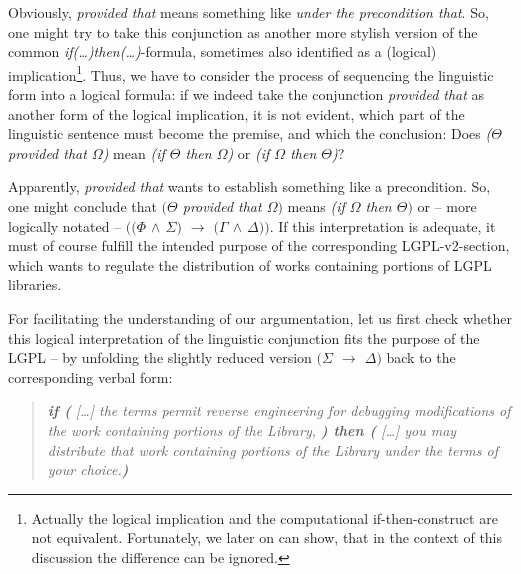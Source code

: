 Obviously, \emph{provided that} means something like \emph{under the
precondition that}. So, one might try to take this conjunction as another more
stylish version of the common \emph{if(\ldots)then(\ldots)}-formula, sometimes
also identified as a (logical) implication\footnote{Actually the logical
implication and the computational if-then-construct are not equivalent.
Fortunately, we later on can show, that in the context of this discussion the
difference can be ignored.}. Thus, we have to consider the process of sequencing
the linguistic form into a logical formula: if we indeed take the conjunction
\emph{provided that} as another form of the logical implication, it is not
evident, which part of the linguistic sentence must become the premise, and
which the conclusion: Does \emph{($\Theta$ provided that $\Omega$)} mean
\emph{(if $\Theta$ then $\Omega$)} or \emph{(if $\Omega$ then $\Theta$)}?

Apparently, \emph{provided that} wants to establish something like a
precondition. So, one might conclude that \emph{$(\Theta$ provided that
$\Omega)$} means \emph{(if $\Omega$ then $\Theta)$} or -- more logically notated
-- \emph{$((\Phi$ $\wedge$ $\Sigma)$ $\rightarrow$ $(\Gamma$ $\wedge$
$\Delta))$}. If this interpretation is adequate, it must of course fulfill the
intended purpose of the corresponding LGPL-v2-section, which wants to regulate
the distribution of works containing portions of LGPL libraries.

For facilitating the understanding of our argumentation, let us first check
whether this logical interpretation of the linguistic conjunction fits the
purpose of the LGPL -- by unfolding the slightly reduced version \emph{$(\Sigma$
$\rightarrow$ $\Delta)$} back to the corresponding verbal form:

\begin{quote}\noindent\emph{\textbf{if (} [\ldots] the terms permit reverse
engineering for debugging modifications of the work containing portions of the
Library, \textbf{) then (} [\ldots] you may distribute that work containing
portions of the Library under the terms of your choice.\textbf{)}}\end{quote}

